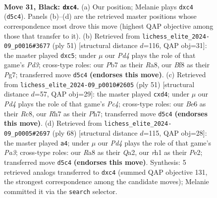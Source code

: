 \documentclass[11pt]{article}
\begin{document}
\clearpage

\begin{figure}[p]\centering
\begin{subfigure}{0.46\textwidth}\centering
\resizebox{\linewidth}{!}{%
\newchessgame
\chessboard[
  setfen={rk3b2/pp4pr/2p1b2p/P2p1p2/2QP3P/2B1P3/1PK2PPN/R6R b - - 0 31},
  showmover=false,
  pgfstyle=straightmove, color=movearrow, markmove={d5-c4}
]}
\caption{}
\end{subfigure}\hfill
\begin{subfigure}{0.46\textwidth}\centering
\resizebox{\linewidth}{!}{%
\newchessgame
\chessboard[
  setfen={r3rbk1/1p3pp1/3p3p/p1BPp3/P1P5/1N5P/1P3PP1/R2R2K1 b - - 0 26},
  showmover=false,
  pgfstyle=straightmove, color=movearrow, markmove={d6-c5}
]}
\caption{}
\end{subfigure}
\\[4pt]
\begin{subfigure}{0.46\textwidth}\centering
\resizebox{\linewidth}{!}{%
\newchessgame
\chessboard[
  setfen={2r1r1k1/4pp1p/p2b2p1/1ppP4/3Q1P2/1P4PP/P1R1P1B1/5RK1 b - - 0 26},
  showmover=false,
  pgfstyle=straightmove, color=movearrow, markmove={c5-d4}
]}
\caption{}
\end{subfigure}\hfill
\begin{subfigure}{0.46\textwidth}\centering
\resizebox{\linewidth}{!}{%
\newchessgame
\chessboard[
  setfen={3r4/4rp1k/3p2pb/qNpBp2p/2P5/PR1P2P1/Q3PPKP/8 w - - 5 35},
  showmover=false,
  pgfstyle=straightmove, color=movearrow, markmove={a3-a4}
]}
\caption{}
\end{subfigure}
\caption{\textbf{Move 31, Black: \texttt{dxc4}.} (a) Our position; Melanie plays \texttt{dxc4} (\texttt{d5c4}). Panels (b)--(d) are the retrieved master positions whose correspondence most drove this move (highest QAP objective among those that transfer to it). (b) Retrieved from \texttt{lichess\_elite\_2024-09\_p0016\#3677} (ply 51) [structural distance $d$=116, QAP obj=31]: the master played \texttt{dxc5}; under $\mu$ our \emph{Pd4} plays the role of that game's \emph{Pd3}; cross-type roles: our \emph{P}b7 as their \emph{R}a8, our \emph{B}f8 as their \emph{P}g7; transferred move \texttt{d5c4} \textbf{(endorses this move)}. (c) Retrieved from \texttt{lichess\_elite\_2024-09\_p0010\#2605} (ply 51) [structural distance $d$=57, QAP obj=29]: the master played \texttt{cxd4}; under $\mu$ our \emph{Pd4} plays the role of that game's \emph{Pc4}; cross-type roles: our \emph{B}e6 as their \emph{R}c8, our \emph{R}h7 as their \emph{P}h7; transferred move \texttt{d5c4} \textbf{(endorses this move)}. (d) Retrieved from \texttt{lichess\_elite\_2024-09\_p0005\#2697} (ply 68) [structural distance $d$=115, QAP obj=28]: the master played \texttt{a4}; under $\mu$ our \emph{Pd4} plays the role of that game's \emph{Pa3}; cross-type roles: our \emph{R}a8 as their \emph{Q}a2, our \emph{r}h1 as their \emph{P}e2; transferred move \texttt{d5c4} \textbf{(endorses this move)}. Synthesis: 5 retrieved analogs transferred to \texttt{dxc4} (summed QAP objective 131, the strongest correspondence among the candidate moves); Melanie committed it via the \texttt{search} selector.}
\label{fig:thought-m61}
\end{figure}
\end{document}
